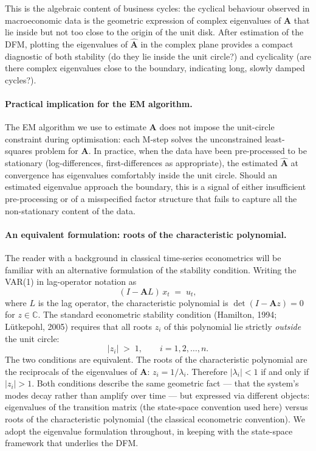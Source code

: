 \documentclass[11pt, a4paper, oneside]{article}
\begin{document}
This is the algebraic content of business cycles: the cyclical
behaviour observed in macroeconomic data is the geometric expression
of complex eigenvalues of $\mathbf{A}$ that lie inside but not too
close to the origin of the unit disk. After estimation of the DFM,
plotting the eigenvalues of $\widehat{\mathbf{A}}$ in the complex
plane provides a compact diagnostic of both stability (do they lie
inside the unit circle?) and cyclicality (are there complex
eigenvalues close to the boundary, indicating long, slowly damped
cycles?).

\paragraph{Practical implication for the EM algorithm.}
The EM algorithm we use to estimate $\mathbf{A}$ does not impose the
unit-circle constraint during optimisation: each M-step solves the
unconstrained least-squares problem for $\mathbf{A}$. In practice,
when the data have been pre-processed to be stationary
(log-differences, first-differences as appropriate), the estimated
$\widehat{\mathbf{A}}$ at convergence has eigenvalues comfortably
inside the unit circle. Should an estimated eigenvalue approach the
boundary, this is a signal of either insufficient pre-processing or
of a misspecified factor structure that fails to capture all the
non-stationary content of the data.

\paragraph{An equivalent formulation: roots of the characteristic polynomial.}
The reader with a background in classical time-series econometrics
will be familiar with an alternative formulation of the stability
condition. Writing the VAR(1) in lag-operator notation as
\[
(I - \mathbf{A} L)\, x_t \;=\; u_t,
\]
where $L$ is the lag operator, the characteristic polynomial is
$\det(I - \mathbf{A} z) = 0$ for $z \in \mathbb{C}$. The standard
econometric stability condition (Hamilton, 1994; L\"utkepohl, 2005)
requires that all roots $z_i$ of this polynomial lie strictly
\emph{outside} the unit circle:
\[
|z_i| \;>\; 1, \qquad i = 1, 2, \ldots, n.
\]
The two conditions are equivalent. The roots of the characteristic
polynomial are the reciprocals of the eigenvalues of $\mathbf{A}$:
$z_i = 1/\lambda_i$. Therefore $|\lambda_i| < 1$ if and only if
$|z_i| > 1$. Both conditions describe the same geometric fact —
that the system's modes decay rather than amplify over time — but
expressed via different objects: eigenvalues of the transition
matrix (the state-space convention used here) versus roots of the
characteristic polynomial (the classical econometric convention).
We adopt the eigenvalue formulation throughout, in keeping with the
state-space framework that underlies the DFM.
\end{document}
